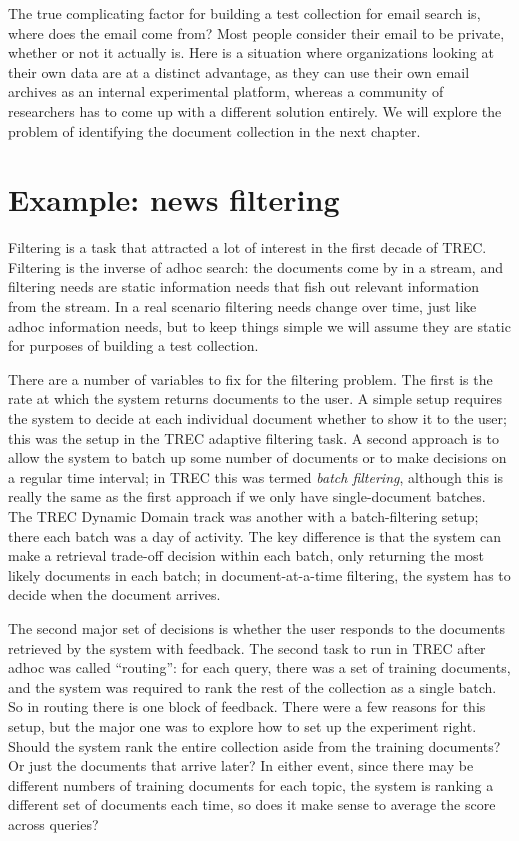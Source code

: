 \documentclass[nobib]{tufte-book}
\begin{document}
The true complicating factor for building a test collection for email search is, where does the email come from?  Most people consider their email to be private, whether or not it actually is.  Here is a situation where organizations looking at their own data are at a distinct advantage, as they can use their own email archives as an internal experimental platform, whereas a community of researchers has to come up with a different solution entirely.  We will explore the problem of identifying the document collection in the next chapter.

\section{Example: news filtering}

Filtering is a task that attracted a lot of interest in the first decade of TREC.  Filtering is the inverse of adhoc search: the documents come by in a stream, and filtering needs are static information needs that fish out relevant information from the stream.  In a real scenario filtering needs change over time, just like adhoc information needs, but to keep things simple we will assume they are static for purposes of building a test collection.

There are a number of variables to fix for the filtering problem.  The first is the rate at which the system returns documents to the user.  A simple setup requires the system to decide at each individual document whether to show it to the user; this was the setup in the TREC adaptive filtering task.  A second approach is to allow the system to batch up some number of documents or to make decisions on a regular time interval; in TREC this was termed {\it batch filtering}, although this is really the same as the first approach if we only have single-document batches.  The TREC Dynamic Domain track was another with a batch-filtering setup; there each batch was a day of activity.  The key difference is that the system can make a retrieval trade-off decision within each batch, only returning the most likely documents in each batch; in document-at-a-time filtering, the system has to decide when the document arrives.

The second major set of decisions is whether the user responds to the documents retrieved by the system with feedback.  The second task to run in TREC after adhoc was called ``routing'': for each query, there was a set of training documents, and the system was required to rank the rest of the collection as a single batch.  So in routing there is one block of feedback.  There were a few reasons for this setup, but the major one was to explore how to set up the experiment right.  Should the system rank the entire collection aside from the training documents?  Or just the documents that arrive later?  In either event, since there may be different numbers of training documents for each topic, the system is ranking a different set of documents each time, so does it make sense to average the score across queries?
\end{document}
